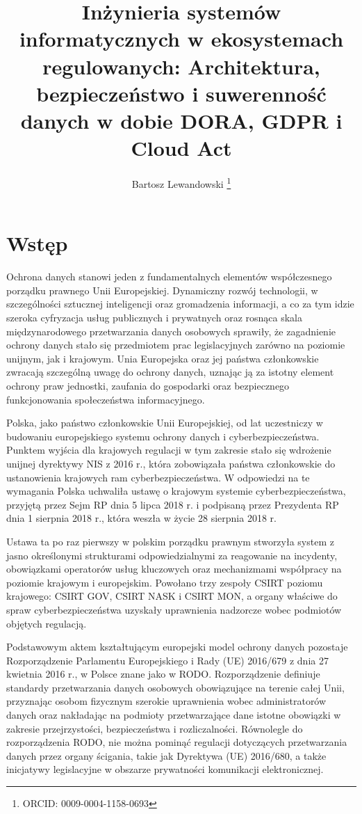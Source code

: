 \documentclass[12pt,a4paper,oneside]{book}
\title{Inżynieria systemów informatycznych w ekosystemach regulowanych: Architektura, bezpieczeństwo i suwerenność danych w dobie DORA, GDPR i Cloud Act}
\author[1]{Bartosz Lewandowski \thanks{ORCID: 0009-0004-1158-0693}}
\affil[1]{Department of Clinical Engineering, Academy of Silesia in Katowice}
\date{}
\begin{document}
\maketitle

\tableofcontents

\chapter{Wstęp}

Ochrona danych stanowi jeden z fundamentalnych elementów współczesnego porządku prawnego Unii Europejskiej. Dynamiczny rozwój technologii, w szczególności sztucznej inteligencji oraz gromadzenia  informacji, a co za tym idzie szeroka cyfryzacja usług publicznych i prywatnych oraz rosnąca skala międzynarodowego przetwarzania danych osobowych sprawiły, że zagadnienie ochrony danych stało się przedmiotem prac legislacyjnych zarówno na poziomie unijnym, jak i krajowym. Unia Europejska oraz jej państwa członkowskie zwracają szczególną uwagę do ochrony danych, uznając ją za istotny element ochrony praw jednostki, zaufania do gospodarki oraz bezpiecznego funkcjonowania społeczeństwa informacyjnego.

Polska, jako państwo członkowskie Unii Europejskiej, od lat uczestniczy w budowaniu europejskiego systemu ochrony danych i cyberbezpieczeństwa. Punktem wyjścia dla krajowych regulacji w tym zakresie stało się wdrożenie unijnej dyrektywy NIS z 2016 r., która zobowiązała państwa członkowskie do ustanowienia krajowych ram cyberbezpieczeństwa. W odpowiedzi na te wymagania Polska uchwaliła ustawę o krajowym systemie cyberbezpieczeństwa, przyjętą przez Sejm RP dnia 5 lipca 2018 r. i podpisaną przez Prezydenta RP dnia 1 sierpnia 2018 r., która weszła w życie 28 sierpnia 2018 r.

Ustawa ta po raz pierwszy w polskim porządku prawnym stworzyła  system z jasno określonymi strukturami odpowiedzialnymi za reagowanie na incydenty, obowiązkami operatorów usług kluczowych oraz mechanizmami współpracy na poziomie krajowym i europejskim. Powołano trzy zespoły CSIRT poziomu krajowego: CSIRT GOV, CSIRT NASK i CSIRT MON, a organy właściwe do spraw cyberbezpieczeństwa uzyskały uprawnienia nadzorcze wobec podmiotów objętych regulacją.

Podstawowym aktem kształtującym europejski model ochrony danych pozostaje Rozporządzenie Parlamentu Europejskiego i Rady (UE) 2016/679 z dnia 27 kwietnia 2016 r., w Polsce znane jako w RODO. Rozporządzenie definiuje standardy przetwarzania danych osobowych obowiązujące na terenie całej Unii, przyznając osobom fizycznym szerokie uprawnienia wobec administratorów danych oraz nakładając na podmioty przetwarzające dane istotne obowiązki w zakresie przejrzystości, bezpieczeństwa i rozliczalności. Równolegle do rozporządzenia RODO, nie można pominąć regulacji  dotyczących przetwarzania danych przez organy ścigania, takie jak Dyrektywa (UE) 2016/680, a także inicjatywy legislacyjne w obszarze prywatności komunikacji elektronicznej.
\end{document}
